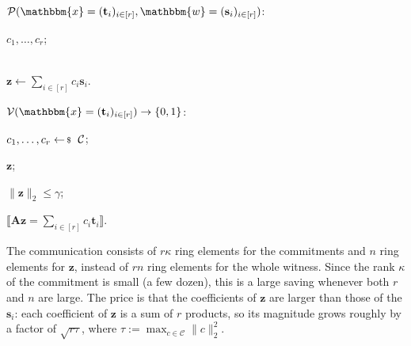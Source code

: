 \documentclass[../../book.tex]{subfiles}
\begin{document}
\begin{algoproto}[ht]
    \small
    \centering
    \begin{mdframed}[linecolor=black, linewidth=1pt,
                     skipabove=10pt, skipbelow=10pt,
                     innerleftmargin=5pt, innerrightmargin=5pt]
        \begin{minipage}[t]{0.47\linewidth}
            \colorbox{oc-blue-1}{$\mathcal{P}(\mathbbm{x} = (\mathbf{t}_i)_{i \in [r]}, \mathbbm{w} = (\mathbf{s}_i)_{i \in [r]})$:}
            \begin{algoen}
                \item {} $c_1, \dots, c_r$;
                \item {} \\  $\mathbf{z} \gets \sum_{i \in [r]} c_i\mathbf{s}_i$.
            \end{algoen}
        \end{minipage}
        \hfill
        \begin{minipage}[t]{0.47\linewidth}
            \colorbox{oc-blue-1}{$\mathcal{V}(\mathbbm{x} = (\mathbf{t}_i)_{i \in [r]}) \to \{0,1\}$:}
            \begin{algoen}
                \item {} $c_1, \dots, c_r \leftarrowS \mathcal{C}$;
                \item {} $\mathbf{z}$;
                \item {} $\|\mathbf{z}\|_2 \leq \gamma$;
                \item {} $\llbracket \mathbf{A}\mathbf{z} = \sum_{i \in [r]} c_i\mathbf{t}_i \rrbracket$.
            \end{algoen}
        \end{minipage}
    \end{mdframed}
    \caption{Attempt \#1: amortized opening of $r$ Ajtai commitments $\mathbf{t}_i = \mathbf{A}\mathbf{s}_i$. Here, $\mathcal{C} \subseteq \mathcal{R}_q$ is a set of short challenge polynomials and $\gamma$ is a public norm bound.}
    \label{fig:labrador-attempt-1}
\end{algoproto}

The communication consists of $r\kappa$ ring elements for the commitments and $n$ ring elements for $\mathbf{z}$, instead of $rn$ ring elements for the whole witness.
Since the rank $\kappa$ of the commitment is small (a few dozen), this is a large saving whenever both $r$ and $n$ are large.
The price is that the coefficients of $\mathbf{z}$ are larger than those of the $\mathbf{s}_i$: each coefficient of $\mathbf{z}$ is a sum of $r$ products, so its magnitude grows roughly by a factor of $\sqrt{r\tau}$, where $\tau := \max_{c \in \mathcal{C}}\|c\|_2^2$.
\end{document}
